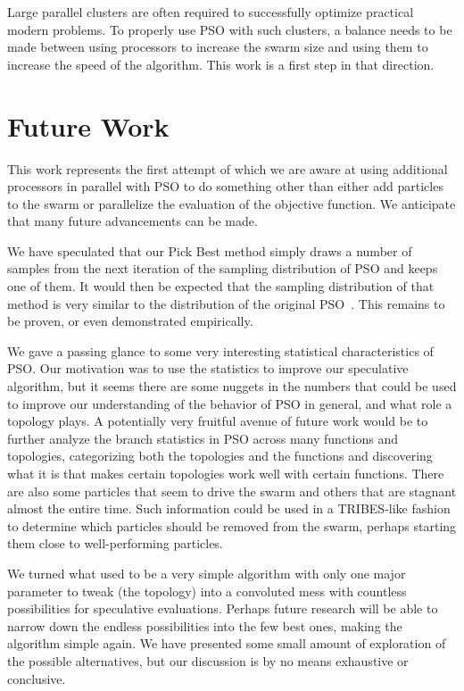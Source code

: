 \documentclass[journal,letterpaper]{IEEEtran}
\begin{document}
Large parallel clusters are often required to successfully optimize practical
modern problems.  To properly use PSO with such clusters, a balance needs to be
made between using processors to increase the swarm size and using them to
increase the speed of the algorithm.  This work is a first step in that
direction.

\section{Future Work}
\label{sec:future}

This work represents the first attempt of which we are aware at using
additional processors in parallel with PSO to do something other than either
add particles to the swarm or parallelize the evaluation of the objective
function.  We anticipate that many future advancements can be made.

We have speculated that our Pick Best method simply draws a number of samples
from the next iteration of the sampling distribution of PSO and keeps one of
them.  It would then be expected that the sampling distribution of that method
is very similar to the distribution of the original
PSO~\cite{poli-2008-sampling-distribution-of-pso}.  This remains to be proven,
or even demonstrated empirically.

We gave a passing glance to some very interesting statistical characteristics
of PSO.  Our motivation was to use the statistics to improve our speculative
algorithm, but it seems there are some nuggets in the numbers that could be
used to improve our understanding of the behavior of PSO in general, and what
role a topology plays.  A potentially very fruitful avenue of future work would
be to further analyze the branch statistics in PSO across many functions and
topologies, categorizing both the topologies and the functions and discovering
what it is that makes certain topologies work well with certain functions.
There are also some particles that seem to drive the swarm and others that are
stagnant almost the entire time.  Such information could be used in a
TRIBES-like fashion~\cite{clerc-2003-tribes} to determine which particles
should be removed from the swarm, perhaps starting them close to
well-performing particles.

We turned what used to be a very simple algorithm with only one major parameter
to tweak (the topology) into a convoluted mess with countless possibilities for
speculative evaluations.  Perhaps future research will be able to narrow down
the endless possibilities into the few best ones, making the algorithm simple
again.  We have presented some small amount of exploration of the possible
alternatives, but our discussion is by no means exhaustive or conclusive.
\end{document}
